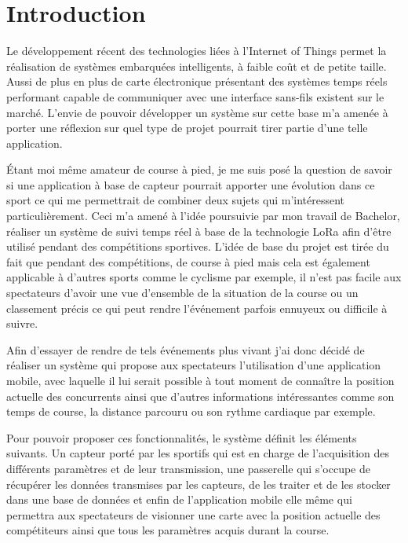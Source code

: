\chapter{Introduction}

Le développement récent des technologies liées à l'Internet of Things permet la réalisation de systèmes embarquées intelligents, à faible coût et de petite taille. Aussi de plus en plus de carte électronique présentant des systèmes temps réels performant capable de communiquer avec une interface sans-fils existent sur le marché. L'envie de pouvoir développer un système sur cette base m'a amenée à porter une réflexion sur quel type de projet pourrait tirer partie d'une telle application. 

Étant moi même amateur de course à pied, je me suis posé la question de savoir si une application à base de capteur pourrait apporter une évolution dans ce sport ce qui me permettrait de combiner deux sujets qui m'intéressent particulièrement. Ceci m'a amené à l'idée poursuivie par mon travail de Bachelor, réaliser un système de suivi temps réel à base de la technologie LoRa afin d'être utilisé pendant des compétitions sportives. L'idée de base du projet est tirée du fait que pendant des compétitions, de course à pied mais cela est également applicable à d'autres sports comme le cyclisme par exemple, il n'est pas facile aux spectateurs d'avoir une vue d'ensemble de la situation de la course ou un classement précis ce qui peut rendre l'événement parfois ennuyeux ou difficile à suivre.

Afin d'essayer de rendre de tels événements plus vivant j'ai donc décidé de réaliser un système qui propose aux spectateurs l'utilisation d'une application mobile, avec laquelle il lui serait possible à tout moment de connaître la position actuelle des concurrents ainsi que d'autres informations intéressantes comme son temps de course, la distance parcouru ou son rythme cardiaque par exemple. 

Pour pouvoir proposer ces fonctionnalités, le système définit les éléments suivants. Un capteur porté par les sportifs qui est en charge de l'acquisition des différents paramètres et de leur transmission, une passerelle qui s'occupe de récupérer les données transmises par les capteurs, de les traiter et de les stocker dans une base de données et enfin de l'application mobile elle même qui permettra aux spectateurs de visionner une carte avec la position actuelle des compétiteurs ainsi que tous les paramètres acquis durant la course.